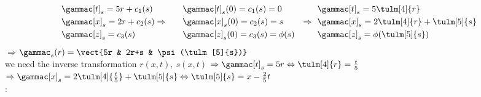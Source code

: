 \begin{notebox}[Solution 2]
                \nospacing
                \begin{alignat*}{3}
                    &\gammac[t]_s=5r+c_1(s)                      &  & \gammac[t]_s(0)=c_1(s)=0       & & \gammac[t]_s=5\tulm[4]{r}\\
                    &\gammac[x]_s=2r+c_2(s)     \Rightarrow\quad &  & \gammac[x]_s(0)=c_2(s)=s           &\Rightarrow\ \ & \gammac[x]_s=2\tulm[4]{r}+\tulm[5]{s}      \\
                    &\gammac[z]_s=c_3(s)                     &  & \gammac[z]_s(0)=c_3(s)=\phi(s) &                    & \gammac[z]_s=\phi(\tulm[5]{s})
                \end{alignat*}
                $\Rightarrow$\hfil$ \gammac_s(r)=\vect{5r & 2r+s & \psi(\tulm[5]{s})}$\\
                 we need the inverse transformation $r(x,t),\ s(x,t)$
                $\Rightarrow \gammac[t]_s=5r \Leftrightarrow \tulm[4]{r}=\frac{t}{5}$\qquad
                    $\Rightarrow  \gammac[x]_s=2\tulm[4]{\frac{t}{5}}+\tulm[5]{s} \Leftrightarrow \tulm[5]{s}=x-\frac{2}{5}t$\\
                : 
\end{notebox}
